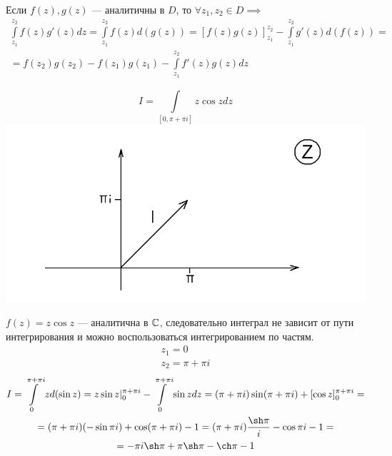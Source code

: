 \documentclass[../../main.tex]{subfiles}
\begin{document}
\begin{crl*}
	Если $f(z), g(z)$ --- аналитичны в $D$, то
	$\forall z_1, z_2 \in D \implies$
\begin{equation}
	\label{lec31:8}
	\begin{gathered}
	\int\limits_{z_1}^{z_2} f(z) g'(z) dz = 
	\int\limits_{z_1}^{z_2} f(z) d(g(z)) =
	[f(z)g(z)]_{z_1}^{z_2} - \int\limits_{z_1}^{z_2} g'(z) d(f(z)) = \\ =
	f(z_2)g(z_2) - f(z_1)g(z_1) - \int\limits_{z_1}^{z_2} f'(z) g(z) dz
	\end{gathered}
\end{equation}
\end{crl*}
\begin{example}
	\[I =  \int\limits_{[0, \pi + \pi i]} z \cos z dz \]
	\includegraphics[scale = 0.3]{lec31_5.png}

	$ f(z) = z \cos z $ --- аналитична в $\mathbb{C}$, следовательно интеграл не
	зависит от пути интегрирования и можно воспользоваться
	интегрированием по частям.
	\[\begin{gathered}	
	z_1 = 0 \\
	z_2 = \pi + \pi i \end{gathered}\]
	\[\begin{gathered}
	I = \int\limits_{0}^{\pi + \pi i} z d(\sin z) =
	z \sin z |_0^{\pi + \pi i} -
	\int\limits_{0}^{\pi + \pi i} \sin z dz =
	(\pi + \pi i) \sin (\pi + \pi i) + [ \cos z ]_0^{\pi + \pi i} = \\ =
	(\pi + \pi i) ( - \sin \pi i) + \cos (\pi + \pi i) - 1 =
	(\pi + \pi i) \dfrac{\sh \pi}{i} - \cos \pi i - 1 = \\ =
	- \pi i \sh \pi + \pi \sh \pi - \ch \pi - 1
	\end{gathered} \]
\end{example}
\end{document}
